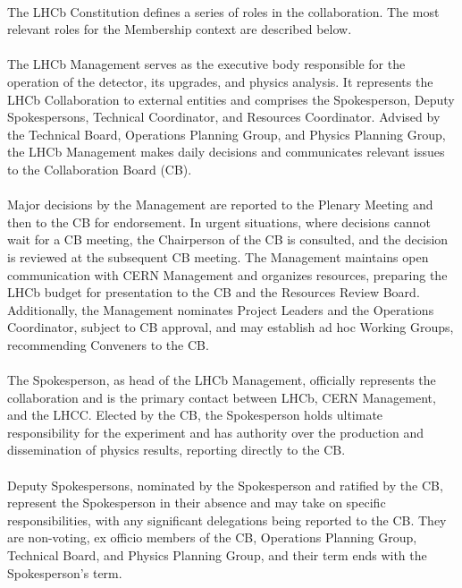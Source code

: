 \paragraph{} The LHCb Constitution \cite{LHCbConstitution} defines a series of roles in the collaboration. The most relevant roles for the Membership context are described below.

\paragraph{} The LHCb Management serves as the executive body responsible for the operation of the detector, its upgrades, and physics analysis. It represents the LHCb Collaboration to external entities and comprises the Spokesperson, Deputy Spokespersons, Technical Coordinator, and Resources Coordinator. Advised by the Technical Board, Operations Planning Group, and Physics Planning Group, the LHCb Management makes daily decisions and communicates relevant issues to the Collaboration Board (CB).

\paragraph{}Major decisions by the Management are reported to the Plenary Meeting and then to the CB for endorsement. In urgent situations, where decisions cannot wait for a CB meeting, the Chairperson of the CB is consulted, and the decision is reviewed at the subsequent CB meeting. The Management maintains open communication with CERN Management and organizes resources, preparing the LHCb budget for presentation to the CB and the Resources Review Board. Additionally, the Management nominates Project Leaders and the Operations Coordinator, subject to CB approval, and may establish ad hoc Working Groups, recommending Conveners to the CB.

\paragraph{}The Spokesperson, as head of the LHCb Management, officially represents the collaboration and is the primary contact between LHCb, CERN Management, and the LHCC. Elected by the CB, the Spokesperson holds ultimate responsibility for the experiment and has authority over the production and dissemination of physics results, reporting directly to the CB.

\paragraph{}Deputy Spokespersons, nominated by the Spokesperson and ratified by the CB, represent the Spokesperson in their absence and may take on specific responsibilities, with any significant delegations being reported to the CB. They are non-voting, ex officio members of the CB, Operations Planning Group, Technical Board, and Physics Planning Group, and their term ends with the Spokesperson's term.

